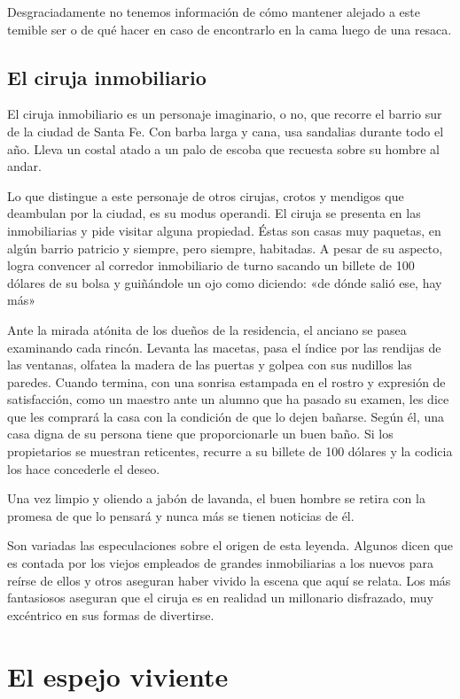 \documentclass[11pt,twoside,openright,a5paper]{book}
\begin{document}
Desgraciadamente no tenemos información de cómo mantener alejado a este temible ser o de qué hacer en caso de encontrarlo en la cama luego de una resaca.

\subsection*{El ciruja inmobiliario}

El ciruja inmobiliario es un personaje imaginario, o no, que recorre el barrio sur de la ciudad de Santa Fe. Con barba larga y cana, usa sandalias durante todo el año. Lleva un costal atado a un palo de escoba que recuesta sobre su hombre al andar.

Lo que distingue a este personaje de otros cirujas, crotos y mendigos que deambulan por la ciudad, es su modus operandi. El ciruja se presenta en las inmobiliarias y pide visitar alguna propiedad. Éstas son casas muy paquetas, en algún barrio patricio y siempre, pero siempre, habitadas. A pesar de su aspecto, logra convencer al corredor inmobiliario de turno sacando un billete de 100 dólares de su bolsa y guiñándole un ojo como diciendo: «de dónde salió ese, hay más»

Ante la mirada atónita de los dueños de la residencia, el anciano se pasea examinando cada rincón. Levanta las macetas, pasa el índice por las rendijas de las ventanas, olfatea la madera de las puertas y golpea con sus nudillos las paredes. Cuando termina, con una sonrisa estampada en el rostro y expresión de satisfacción, como un maestro ante un alumno que ha pasado su examen, les dice que les comprará la casa con la condición de que lo dejen bañarse. Según él, una casa digna de su persona tiene que proporcionarle un buen baño. Si los propietarios se muestran reticentes, recurre a su billete de 100 dólares y la codicia los hace concederle el deseo.

Una vez limpio y oliendo a jabón de lavanda, el buen hombre se retira con la promesa de que lo pensará y nunca más se tienen noticias de él.

Son variadas las especulaciones sobre el origen de esta leyenda. Algunos dicen que es contada por los viejos empleados de grandes inmobiliarias a los nuevos para reírse de ellos y otros aseguran haber vivido la escena que aquí se relata. Los más fantasiosos aseguran que el ciruja es en realidad un millonario disfrazado, muy excéntrico en sus formas de divertirse.

\section*{El espejo viviente}
\end{document}
